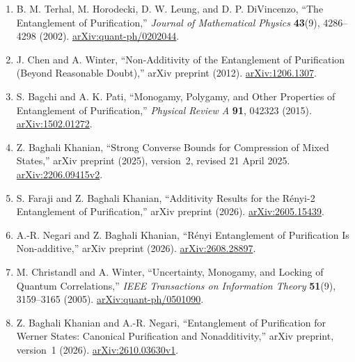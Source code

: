 \begin{enumerate}[label={},leftmargin=4.8em,labelsep=0.5em]
  \footnotesize
  \item[\textup{[THLD02]}]\label{ref:epur-terhal}
  B. M. Terhal, M. Horodecki, D. W. Leung, and D. P. DiVincenzo,
  ``The Entanglement of Purification,'' \emph{Journal of Mathematical Physics}
  \textbf{43}(9), 4286--4298 (2002).
  \href{https://arxiv.org/abs/quant-ph/0202044}{arXiv:quant-ph/0202044}.

  \item[\textup{[CW12]}]\label{ref:epur-chen-winter}
  J. Chen and A. Winter,
  ``Non-Additivity of the Entanglement of Purification (Beyond Reasonable
  Doubt),'' arXiv preprint (2012).
  \href{https://arxiv.org/abs/1206.1307}{arXiv:1206.1307}.

  \item[\textup{[BP15]}]\label{ref:epur-bagchi-pati}
  S. Bagchi and A. K. Pati,
  ``Monogamy, Polygamy, and Other Properties of Entanglement of
  Purification,'' \emph{Physical Review A} \textbf{91}, 042323 (2015).
  \href{https://arxiv.org/abs/1502.01272}{arXiv:1502.01272}.

  \item[\textup{[KB25]}]\label{ref:epur-khanian}
  Z. Baghali Khanian,
  ``Strong Converse Bounds for Compression of Mixed States,'' arXiv preprint
  (2025), version~2, revised 21 April 2025.
  \href{https://arxiv.org/abs/2206.09415v2}{arXiv:2206.09415v2}.

  \item[\textup{[FBK26]}]\label{ref:epur-faraji}
  S. Faraji and Z. Baghali Khanian,
  ``Additivity Results for the R\'enyi-2 Entanglement of Purification,''
  arXiv preprint (2026).
  \href{https://arxiv.org/abs/2605.15439}{arXiv:2605.15439}.

  \item[\textup{[NBK26]}]\label{ref:epur-negari}
  A.-R. Negari and Z. Baghali Khanian,
  ``R\'enyi Entanglement of Purification Is Non-additive,'' arXiv preprint
  (2026).
  \href{https://arxiv.org/abs/2608.28897}{arXiv:2608.28897}.

  \item[\textup{[CW05]}]\label{ref:epur-christandl-winter}
  M. Christandl and A. Winter,
  ``Uncertainty, Monogamy, and Locking of Quantum Correlations,''
  \emph{IEEE Transactions on Information Theory} \textbf{51}(9), 3159--3165
  (2005).
  \href{https://arxiv.org/abs/quant-ph/0501090}{arXiv:quant-ph/0501090}.

  \item[\textup{[BKN26]}]\label{ref:epur-werner-nonadditivity}
  Z. Baghali Khanian and A.-R. Negari,
  ``Entanglement of Purification for Werner States: Canonical Purification and Nonadditivity,'' arXiv preprint, version~1 (2026).
  \href{https://arxiv.org/abs/2610.03630v1}{arXiv:2610.03630v1}.
\end{enumerate}

